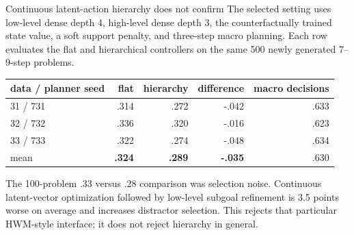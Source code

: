 \documentclass[aspectratio=169,10pt]{beamer}
\newcommand{\good}[1]{\textcolor{cgreen}{\textbf{#1}}}
\newcommand{\bad}[1]{\textcolor{cred}{\textbf{#1}}}
\begin{document}
\begin{frame}{Continuous latent-action hierarchy does not confirm}
\small
The selected setting uses low-level dense depth 4, high-level dense depth 3,
the counterfactually trained state value, a soft support penalty, and
three-step macro planning. Each row evaluates the flat and hierarchical
controllers on the same 500 newly generated 7--9-step problems.

\medskip
\centering
\begin{tabular}{lrrrr}
\toprule
data / planner seed & flat & hierarchy & difference & macro decisions\\
\midrule
31 / 731 & .314 & .272 & -.042 & .633\\
32 / 732 & .336 & .320 & -.016 & .623\\
33 / 733 & .322 & .274 & -.048 & .634\\
\midrule
mean & \good{.324} & \bad{.289} & \bad{-.035} & .630\\
\bottomrule
\end{tabular}

\medskip
The 100-problem .33 versus .28 comparison was selection noise. Continuous
latent-vector optimization followed by low-level subgoal refinement is 3.5
points worse on average and increases distractor selection. This rejects that
particular HWM-style interface; it does not reject hierarchy in general.
\end{frame}
\end{document}
